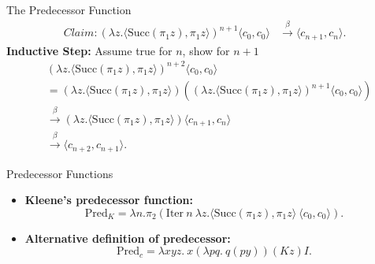 \documentclass{beamer}
\begin{document}
\begin{frame}{The Predecessor Function}
  \begin{align*}Claim:
    (\lambda z. \langle \text{Succ}(\pi_1 z), \pi_1 z \rangle)^{n+1} \langle c_0, c_0 \rangle &\xrightarrow{\beta} \langle c_{n+1}, c_n \rangle.
  \end{align*}
  \textbf{Inductive Step:} Assume true for \(n\), show for \(n+1\)\\
  \[
  \begin{aligned}
    &(\lambda z. \langle \text{Succ}(\pi_1 z), \pi_1 z \rangle)^{n+2} \langle c_0, c_0 \rangle \\
    &= (\lambda z. \langle \text{Succ}(\pi_1 z), \pi_1 z \rangle)((\lambda z. \langle \text{Succ}(\pi_1 z), \pi_1 z \rangle)^{n+1} \langle c_0, c_0 \rangle) \\
    &\xrightarrow{\beta} (\lambda z. \langle \text{Succ}(\pi_1 z), \pi_1 z \rangle) \langle c_{n+1}, c_n \rangle \\
    &\xrightarrow{\beta} \langle c_{n+2}, c_{n+1} \rangle.
  \end{aligned}
  \]
\end{frame}
\begin{frame}{Predecessor Functions}
  \begin{itemize}
    \item \textbf{Kleene's predecessor function:}
      \[
      \text{Pred}_K = \lambda n. \pi_2 (\text{Iter} \ n \ \lambda z. \langle \text{Succ}(\pi_1 z), \pi_1 z \rangle \ \langle c_0, c_0 \rangle).
      \]
  
    \item \textbf{Alternative definition of predecessor:}
      \[
      \text{Pred}_c = \lambda x y z.\ x(\lambda p q.\ q(p y)) (K z) I.
      \]
  \end{itemize}
\end{frame}


\end{document}
